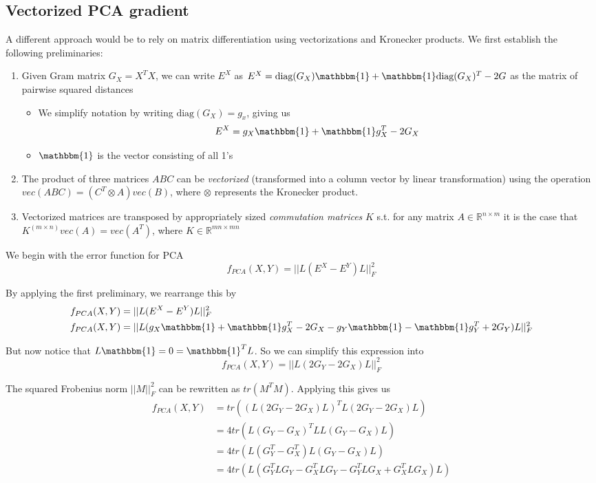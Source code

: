 \documentclass{article}
\theoremstyle{definition}
\begin{document}
\subsection{Vectorized PCA gradient}
A different approach would be to rely on matrix differentiation using vectorizations and Kronecker products. We first establish the following preliminaries:
\begin{enumerate}
    \item Given Gram matrix $G_X = X^T X$, we can write $E^X$ as $E^X = \text{diag}(G_X) \mathbbm{1} + \mathbbm{1} \text{diag}(G_X)^T - 2G$ as the matrix of
        pairwise squared distances
    \begin{itemize}
        \item We simplify notation by writing $\text{diag}(G_X) = g_x$, giving us
            \[ E^X = g_X \mathbbm{1} + \mathbbm{1} g_X^T - 2G_X \]
        \item $\mathbbm{1}$ is the vector consisting of all 1's
    \end{itemize}
    \item The product of three matrices $ABC$ can be \textit{vectorized} (transformed into a column vector by linear transformation) using the operation
        $\textit{vec}(ABC) = (C^T \otimes A) \textit{vec}(B)$, where $\otimes$ represents the Kronecker product.
    \item Vectorized matrices are transposed by appropriately sized \textit{commutation matrices} $K$ s.t. for any matrix $A \in \mathbb{R}^{n \times m}$ it is
        the case that $K^{(m \times n)} \textit{vec}(A) = \textit{vec}(A^T)$, where $K \in \mathbb{R}^{mn \times mn}$
\end{enumerate}

We begin with the error function for PCA
\[ f_{PCA}(X, Y) = ||L(E^X - E^Y)L||_F^2 \]

By applying the first preliminary, we rearrange this by
\begin{align*}
    f_{PCA}(X, Y) &= ||L(E^X - E^Y)L||_F^2 \\
    f_{PCA}(X, Y) &= ||L(g_X \mathbbm{1} + \mathbbm{1} g_X^T - 2G_X - g_Y \mathbbm{1} - \mathbbm{1} g_Y^T + 2G_Y)L||_F^2 
\end{align*}

But now notice that $L \mathbbm{1} = 0 = \mathbbm{1}^T L$. So we can simplify this expression into
\[ f_{PCA}(X, Y) = ||L(2G_Y - 2G_X)L||_F^2 \]

The squared Frobenius norm $||M||_F^2$ can be rewritten as $tr(M^T M)$. Applying this gives us
\begin{align*}
    f_{PCA}(X, Y) &= tr \left( \left(L(2G_Y - 2G_X)L\right)^T L(2G_Y - 2G_X)L \right) \\
    &= 4 tr \left( L (G_Y - G_X)^T L L(G_Y - G_X)L \right) \\
    &= 4 tr \left( L (G_Y^T - G_X^T) L (G_Y - G_X)L \right) \\
    &= 4 tr \left( L (G_Y^T L G_Y - G_X^T L G_Y - G_Y^T L G_X + G_X^T L G_X )L \right) \\
\end{align*}
\end{document}
